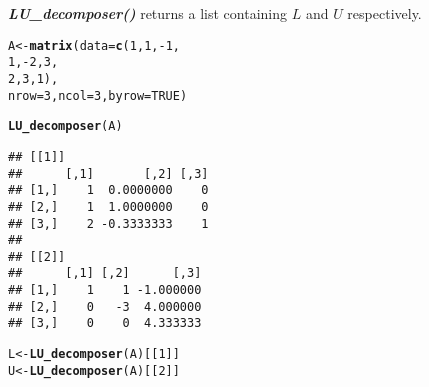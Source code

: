 \documentclass[11pt, a4paper]{article}\usepackage[]{graphicx}\usepackage[]{xcolor}
\makeatletter
\newcommand{\hlnum}[1]{\textcolor[rgb]{0.686,0.059,0.569}{#1}}%
\newcommand{\hlopt}[1]{\textcolor[rgb]{0,0,0}{#1}}%
\newcommand{\hldef}[1]{\textcolor[rgb]{0.345,0.345,0.345}{#1}}%
\newcommand{\hlkwb}[1]{\textcolor[rgb]{0.69,0.353,0.396}{#1}}%
\newcommand{\hlkwc}[1]{\textcolor[rgb]{0.333,0.667,0.333}{#1}}%
\newcommand{\hlkwd}[1]{\textcolor[rgb]{0.737,0.353,0.396}{\textbf{#1}}}%
\newenvironment{kframe}{%
 \def\at@end@of@kframe{}%
 \ifinner\ifhmode%
  \def\at@end@of@kframe{\end{minipage}}%
  \begin{minipage}{\columnwidth}%
 \fi\fi%
 \def\FrameCommand##1{\hskip\@totalleftmargin \hskip-\fboxsep
 \colorbox{shadecolor}{##1}\hskip-\fboxsep
     \hskip-\linewidth \hskip-\@totalleftmargin \hskip\columnwidth}%
 \MakeFramed {\advance\hsize-\width
   \@totalleftmargin\z@ \linewidth\hsize
   \@setminipage}}%
 {\par\unskip\endMakeFramed%
 \at@end@of@kframe}
\newenvironment{knitrout}{}{} %
\makeatother
\begin{document}
\textbf{\textit{LU\_decomposer()}} returns a list containing $L$ and $U$ respectively.

\begin{knitrout}
\color{fgcolor}\begin{kframe}
\begin{alltt}
\hldef{A} \hlkwb{<-} \hlkwd{matrix}\hldef{(}\hlkwc{data} \hldef{=} \hlkwd{c}\hldef{(}\hlnum{1}\hldef{,} \hlnum{1}\hldef{,} \hlopt{-}\hlnum{1}\hldef{,}
                     \hlnum{1}\hldef{,} \hlopt{-}\hlnum{2}\hldef{,} \hlnum{3}\hldef{,}
                     \hlnum{2}\hldef{,} \hlnum{3}\hldef{,} \hlnum{1}\hldef{),}
            \hlkwc{nrow} \hldef{=} \hlnum{3}\hldef{,} \hlkwc{ncol} \hldef{=} \hlnum{3}\hldef{,} \hlkwc{byrow} \hldef{=} \hlnum{TRUE}\hldef{)}
\end{alltt}
\end{kframe}
\end{knitrout}

\begin{knitrout}
\color{fgcolor}\begin{kframe}
\begin{alltt}
\hlkwd{LU_decomposer}\hldef{(A)}
\end{alltt}
\begin{verbatim}
## [[1]]
##      [,1]       [,2] [,3]
## [1,]    1  0.0000000    0
## [2,]    1  1.0000000    0
## [3,]    2 -0.3333333    1
## 
## [[2]]
##      [,1] [,2]      [,3]
## [1,]    1    1 -1.000000
## [2,]    0   -3  4.000000
## [3,]    0    0  4.333333
\end{verbatim}
\end{kframe}
\end{knitrout}

\begin{knitrout}
\color{fgcolor}\begin{kframe}
\begin{alltt}
\hldef{L} \hlkwb{<-} \hlkwd{LU_decomposer}\hldef{(A)[[}\hlnum{1}\hldef{]]}
\hldef{U} \hlkwb{<-} \hlkwd{LU_decomposer}\hldef{(A)[[}\hlnum{2}\hldef{]]}
\end{alltt}
\end{kframe}
\end{knitrout}

\newpage

\faArrowAltCircleRight[regular] \hspace{0.2cm}
\end{document}
